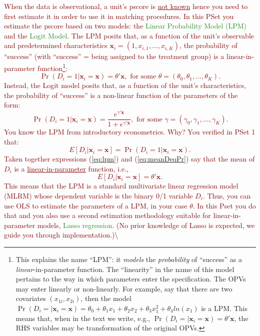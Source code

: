 \documentclass[
]{article}
\begin{document}
\noindent \textcolor{Maroon}{When the data is observational, a unit's pscore is \underline{not known} hence you need to first estimate it in order to use it in matching procedures. In this PSet you estimate the pscore based on two models: the \textcolor{ForestGreen}{Linear Probability Model (LPM)} and the \textcolor{ForestGreen}{Logit Model}. The LPM posits that, as a function of the unit's observable and predetermined characteristics $\mathbf{x}_i=(1, x_{i,1},\ldots,x_{i,K})$, the probability of ``success'' (with ``success'' = being assigned to the treatment group) is a linear-in-parameter function\footnote{This explains the name ``LPM'': it \textit{models} the \textit{probability} of “success” as a \textit{linear}-in-parameter function. The ``linearity'' in the name of this model pertains to the way in which parameters enter the specification. The OPVs may enter linearly or non-linearly. For example, say that there are two covariates $(x_{1i},x_{2i})$, then the model $\Pr(D_i=|\mathbf{x}_i=\mathbf{x})=\theta_0+\theta_1 x_{1}+\theta_2 x_{2}+\theta_3 x_{1}^2+\theta_4 ln(x_{1})$ is a LPM. This means that, when in the text we write, e.g., $\Pr(D_i=|\mathbf{x}_i=\mathbf{x})=\theta'\mathbf{x}$, the RHS variables may be transformation of the original OPVs.}:
\begin{equation}\label{eq:lpm}
\Pr(D_i=1|\mathbf{x}_i=\mathbf{x})=\theta'\mathbf{x}, \text{ for some } \theta=(\theta_0,\theta_1, \ldots, \theta_K).
\end{equation}
\noindent Instead, the Logit model posits that, as a function of the unit's characteristics, the probability of ``success'' is a non-linear function of the parameters of the form:
\begin{equation}\label{eq:logit}
\Pr(D_i=1|\mathbf{x}_i=\mathbf{x})=\frac{e^{\gamma'\mathbf{x}}}{1 + e^{\gamma'\mathbf{x}}}, \text{ for some } \gamma=(\gamma_0,\gamma_1, \ldots, \gamma_K).
\end{equation}
\noindent You know the LPM from introductory econometrics. Why? You verified in PSet 1 that: 
\begin{equation}\label{eq:meanDeqPr}
E[D_i|\mathbf{x}_i=\mathbf{x}]=\Pr(D_i=1|\mathbf{x}_i=\mathbf{x}).
\end{equation}
Taken together expressions (\ref{eq:lpm}) and (\ref{eq:meanDeqPr}) say that the mean of $D_i$ is a \underline{linear-in-parameter} function, i.e., 
\begin{equation}\label{eq:meanLPM}
E[D_i|\mathbf{x}_i=\mathbf{x}]=\theta'\mathbf{x}. 
\end{equation}
This means that the LPM is a standard multivariate linear regression model (MLRM) whose dependent variable is the binary 0/1 variable $D_i$. Thus, you can use OLS to estimate the parameters of a LPM, in your case $\theta$. In this Pset you do that and you also use a second estimation methodology suitable for linear-in-parameter models, \textcolor{ForestGreen}{Lasso regression}. (No prior knowledge of Lasso is expected, we guide you through implementation.)}\textbackslash{}
\end{document}
